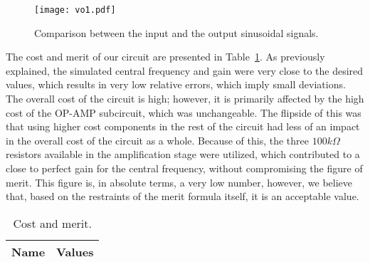 \begin{figure}[h!] \centering
\texttt{[image: vo1.pdf]}
\caption{Comparison between the input and the output sinusoidal signals.}
\label{fig:comp}
\end{figure}

\pagebreak

The cost and merit of our circuit are presented in Table~\ref{tab:merit}. As previously explained, the simulated central frequency and gain  were very close to the desired values, which results in very low relative errors, which imply small deviations. The overall cost of the circuit is high; however, it is primarily affected by the high cost of the OP-AMP subcircuit, which was unchangeable. The flipside of this was that using higher cost components in the rest of the circuit had less of an impact in the overall cost of the circuit as a whole. Because of this, the three $100 k\Omega$ resistors available in the amplification stage were utilized, which contributed to a close to perfect gain for the central frequency, without compromising the figure of merit. This figure is, in absolute terms, a very low number, however, we believe that, based on the restraints of the merit formula itself, it is an acceptable value.
\pagebreak

\par
\begin{table}[h!]
  \centering
  \begin{tabular}{|l|r|}
    \hline    
    {\bf Name} & {\bf Values} \\ \hline
     
  \end{tabular}
  \caption{Cost and merit.}
  \label{tab:merit}
\end{table}

\pagebreak
